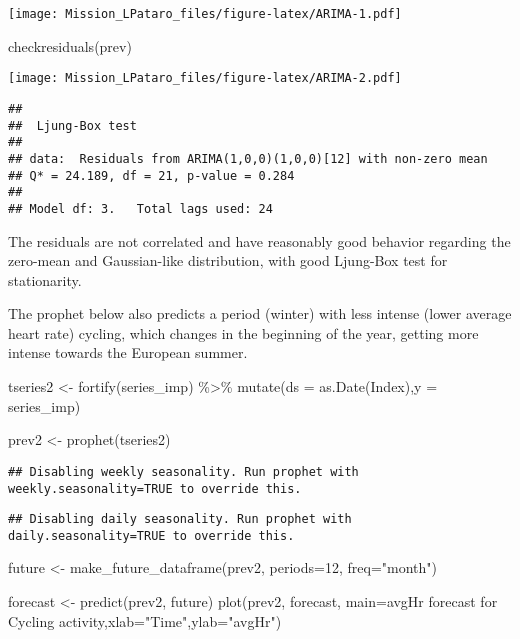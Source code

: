 \documentclass[
]{article}
\newenvironment{Shaded}{\begin{snugshade}}{\end{snugshade}}
\newcommand{\AttributeTok}[1]{\textcolor[rgb]{0.77,0.63,0.00}{#1}}
\newcommand{\DecValTok}[1]{\textcolor[rgb]{0.00,0.00,0.81}{#1}}
\newcommand{\FunctionTok}[1]{\textcolor[rgb]{0.00,0.00,0.00}{#1}}
\newcommand{\NormalTok}[1]{#1}
\newcommand{\OtherTok}[1]{\textcolor[rgb]{0.56,0.35,0.01}{#1}}
\newcommand{\SpecialCharTok}[1]{\textcolor[rgb]{0.00,0.00,0.00}{#1}}
\newcommand{\StringTok}[1]{\textcolor[rgb]{0.31,0.60,0.02}{#1}}
\begin{document}
\texttt{[image: Mission\_LPataro\_files/figure-latex/ARIMA-1.pdf]}

\begin{Shaded}
\begin{Highlighting}[]
\FunctionTok{checkresiduals}\NormalTok{(prev)}
\end{Highlighting}
\end{Shaded}

\texttt{[image: Mission\_LPataro\_files/figure-latex/ARIMA-2.pdf]}

\begin{verbatim}
## 
##  Ljung-Box test
## 
## data:  Residuals from ARIMA(1,0,0)(1,0,0)[12] with non-zero mean
## Q* = 24.189, df = 21, p-value = 0.284
## 
## Model df: 3.   Total lags used: 24
\end{verbatim}

The residuals are not correlated and have reasonably good behavior
regarding the zero-mean and Gaussian-like distribution, with good
Ljung-Box test for stationarity.

The prophet below also predicts a period (winter) with less intense
(lower average heart rate) cycling, which changes in the beginning of
the year, getting more intense towards the European summer.

\begin{Shaded}
\begin{Highlighting}[]
\NormalTok{tseries2 }\OtherTok{\textless{}{-}} \FunctionTok{fortify}\NormalTok{(series\_imp) }\SpecialCharTok{\%\textgreater{}\%} 
  \FunctionTok{mutate}\NormalTok{(}\AttributeTok{ds =} \FunctionTok{as.Date}\NormalTok{(Index),}\AttributeTok{y =}\NormalTok{ series\_imp)}

\NormalTok{prev2 }\OtherTok{\textless{}{-}} \FunctionTok{prophet}\NormalTok{(tseries2)}
\end{Highlighting}
\end{Shaded}

\begin{verbatim}
## Disabling weekly seasonality. Run prophet with weekly.seasonality=TRUE to override this.
\end{verbatim}

\begin{verbatim}
## Disabling daily seasonality. Run prophet with daily.seasonality=TRUE to override this.
\end{verbatim}

\begin{Shaded}
\begin{Highlighting}[]
\NormalTok{future }\OtherTok{\textless{}{-}} \FunctionTok{make\_future\_dataframe}\NormalTok{(prev2, }\AttributeTok{periods=}\DecValTok{12}\NormalTok{, }\AttributeTok{freq=}\StringTok{"month"}\NormalTok{) }

\NormalTok{forecast }\OtherTok{\textless{}{-}} \FunctionTok{predict}\NormalTok{(prev2, future)}
\FunctionTok{plot}\NormalTok{(prev2, forecast, }\AttributeTok{main=}\StringTok{\textquotesingle{}avgHr forecast for Cycling activity\textquotesingle{}}\NormalTok{,}\AttributeTok{xlab=}\StringTok{"Time"}\NormalTok{,}\AttributeTok{ylab=}\StringTok{"avgHr"}\NormalTok{)}
\end{Highlighting}
\end{Shaded}
\end{document}

